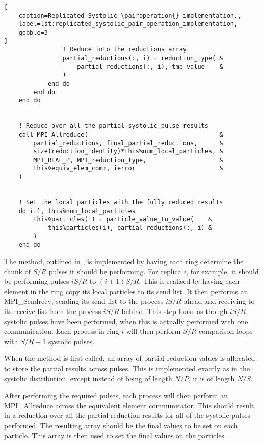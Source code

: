 \begin{lstlisting}[
    caption=Replicated Systolic \pairoperation{} implementation.,
    label=lst:replicated_systolic_pair_operation_implementation,
    gobble=3
]
                ! Reduce into the reductions array
                partial_reductions(:, i) = reduction_type( &
                    partial_reductions(:, i), tmp_value    &
                )
            end do
        end do
    end do


    ! Reduce over all the partial systolic pulse results
    call MPI_Allreduce(                                    &
        partial_reductions, final_partial_reductions,      &
        size(reduction_identity)*this%num_local_particles, &
        MPI_REAL_P, MPI_reduction_type,                    &
        this%equiv_elem_comm, ierror                       &
    )


    ! Set the local particles with the fully reduced results
    do i=1, this%num_local_particles
        this%particles(i) = particle_value_to_value(    &
            this%particles(i), partial_reductions(:, i) &
        )
    end do
\end{lstlisting}

The \pairoperation{} method, outlined in
,
is implemented by having each ring
determine the chunk of $S/R$ pulses it should be performing.
%
For replica $i$, for example, it should be performing pulses
$iS/R$ to $(i+1)S/R$.
%
This is realised by having each element in the ring copy its local
particles to its send list.
%
It then performs an MPI\_Sendrecv, sending its send list to
the process $iS/R$ ahead and receiving to its receive list from
the process $iS/R$ behind.
%
This step looks as though $iS/R$ systolic pulses have been performed,
when this is actually performed with one communication.
%
Each process in ring $i$ will then perform $S/R$ comparison loops
with $S/R-1$ systolic pulses.

When the method is first called, an array of partial reduction
values is allocated to store the partial results across pulses.
%
This is implemented exactly as in the systolic distribution,
except instead of being of length $N/P$, it is of length $N/S$.

After performing the required pulses, each process will then perform
an MPI\_Allreduce across the equivalent element communicator.
%
This should result in a reduction over all the partial reduction
results for all of the systolic pulses performed.
%
The resulting array should be the final values to be set on each particle.
%
This array is then used to set the final values on the particles.
